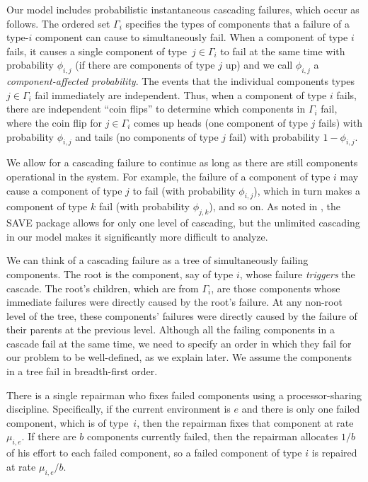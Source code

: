 \documentclass[12pt]{article}
\begin{document}
Our model includes probabilistic
instantaneous cascading failures,
which occur as follows.
The ordered set $\Gamma_i$ specifies
the types of components
that a failure of a type-$i$ component
can cause to simultaneously fail.
When a component of type $i$ fails,
it causes a single 
component of type~$j \in \Gamma_i$
to fail at the same time
with probability
$\phi_{i, j}$
(if there are components of type $j$ up) and we call $\phi_{i, j}$ 
a \textit{component-affected probability}.
The events that the individual components
types~$j \in \Gamma_i$
fail immediately are independent.
Thus, when a component of type $i$ fails,
there are independent ``coin flips''
to determine which components in $\Gamma_i$ fail,
where the coin flip for $j \in \Gamma_i$
comes up heads (one component of
type $j$ fails) with probability $\phi_{i, j}$
and tails
(no components of type $j$ fail)
with probability $1 - \phi_{i, j}$.

We allow for a cascading failure to continue
as long as there are still components operational
in the system.  For example, the failure of
a component of type $i$ may cause
a component of type $j$ to fail
(with probability $\phi_{i, j}$),
which in turn makes a component of type $k$
fail (with probability $\phi_{j, k}$),
and so on.
As noted in \cite{ING:2009},
the SAVE package \cite{BHLNS:1994}
allows for only one level of cascading,
but the unlimited cascading in our model
makes it significantly more difficult
to analyze.

We can think of a cascading failure
as a tree of simultaneously failing components.
The root is the component, say of type $i$,
whose failure \textit{triggers} the cascade.
The root's children, which are from
$\Gamma_i$, are those components
whose immediate failures
were directly caused by the
root's failure.
At any non-root level of the tree, 
these components'
failures were directly caused by the
failure of their parents at the previous level.
Although all the failing components
in a cascade fail at the same time,
we need to specify an order in which
they fail for our problem to
be well-defined, as we explain later.
We assume the components in a tree
fail in breadth-first order.


There is a single repairman who
fixes failed components using
a processor-sharing discipline.
Specifically, if the current
environment is $e$ and there
is only one failed component,
which is of type~$i$, then
the repairman fixes that component
at rate $\mu_{i, e}$.
If there are $b$ components currently failed,
then the repairman allocates $1/b$ of
his effort to each failed component,
so a failed component of type $i$ is
repaired at rate $\mu_{i, e}/b$.
\end{document}
